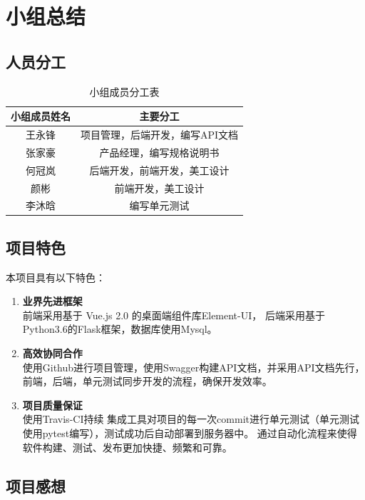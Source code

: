 
\chapter{小组总结}

\section{人员分工}

\begin{table}[h] %
	\centering
        \label{tab:glossary}
        \caption{小组成员分工表}
		\begin{tabular}{*{2}{c}}
			\toprule
	 		小组成员姓名 & 主要分工\\
            \midrule
            王永锋 & 项目管理，后端开发，编写API文档 \\
            张家豪 & 产品经理，编写规格说明书 \\
            何冠岚 & 后端开发，前端开发，美工设计 \\
            颜彬 & 前端开发，美工设计 \\
            李沐晗 & 编写单元测试 \\
			\bottomrule
		\end{tabular}
\end{table}



\section{项目特色}

本项目具有以下特色：

\begin{enumerate}
    \item \textbf{业界先进框架} \\ 前端采用基于 Vue.js 2.0 的桌面端组件库Element-UI， 后端采用基于Python3.6的Flask框架，数据库使用Mysql。
    \item \textbf{高效协同合作} \\ 使用Github进行项目管理，使用Swagger构建API文档，并采用API文档先行，前端，后端，单元测试同步开发的流程，确保开发效率。
    \item \textbf{项目质量保证} \\ 使用Travis-CI持续 集成工具对项目的每一次commit进行单元测试（单元测试使用pytest编写），测试成功后自动部署到服务器中。 通过自动化流程来使得软件构建、测试、发布更加快捷、频繁和可靠。
\end{enumerate}


\section{项目感想}

